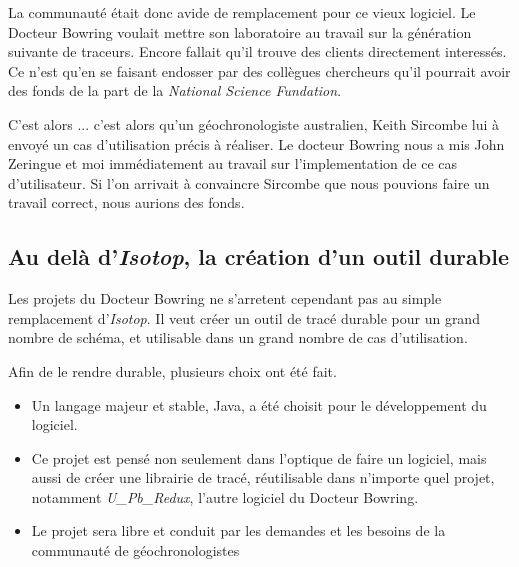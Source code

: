 La communauté était donc avide de remplacement pour ce vieux logiciel. Le Docteur Bowring voulait mettre son laboratoire au travail sur la génération suivante de traceurs. Encore fallait qu'il trouve des clients directement interessés. Ce n'est qu'en se faisant endosser par des collègues chercheurs qu'il pourrait avoir des fonds de la part de la \textit{National Science Fundation}.

C'est alors ... c'est alors qu'un géochronologiste australien, Keith Sircombe lui à envoyé un cas d'utilisation précis à réaliser. Le docteur Bowring nous a mis John Zeringue et moi immédiatement au travail sur l'implementation de ce cas d'utilisateur. Si l'on arrivait à convaincre Sircombe que nous pouvions faire un travail correct, nous aurions des fonds.

\subsection{Au delà d'\textit{Isotop}, la création d'un outil durable}
Les projets du Docteur Bowring ne s'arretent cependant pas au simple remplacement d'\textit{Isotop}. Il veut créer un outil de tracé durable pour un grand nombre de schéma, et utilisable dans un grand nombre de cas d'utilisation.

Afin de le rendre durable, plusieurs choix ont été fait. 
\begin{itemize}
\item Un langage majeur et stable, Java, a été choisit pour le développement du logiciel.
\item Ce projet est pensé non seulement dans l'optique de faire un logiciel, mais aussi de créer une librairie de tracé, réutilisable dans n'importe quel projet, notamment \textit{U\_Pb\_Redux}, l'autre logiciel du Docteur Bowring.
\item Le projet sera libre et conduit par les demandes et les besoins de la communauté de géochronologistes
\end{itemize}

